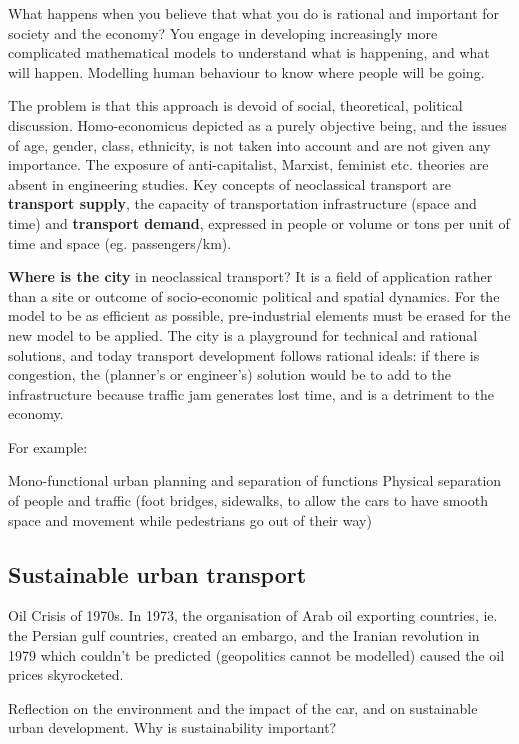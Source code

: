 \documentclass{article}
\begin{document}
What happens when you believe that what you do is rational and important for society and the economy? You engage in developing increasingly more complicated mathematical models to understand what is happening, and what will happen. Modelling human behaviour to know where people will be going. 

The problem is that this approach is devoid of social, theoretical, political discussion. Homo-economicus depicted as a purely objective being, and the issues of age, gender, class, ethnicity, is not taken into account and are not given any importance. The exposure of anti-capitalist, Marxist, feminist etc. theories are absent in engineering studies.
Key concepts of neoclassical transport are \textbf{transport supply}, the capacity of transportation infrastructure (space and time) and \textbf{transport demand}, expressed in people or volume or tons per unit of time and space (eg. passengers/km).

\textbf{Where is the city} in neoclassical transport? It is a field of application rather than a site or outcome of socio-economic political and spatial dynamics. For the model to be as efficient as possible, pre-industrial elements must be erased for the new model to be applied. The city is a playground for technical and rational solutions, and today transport development follows rational ideals: if there is congestion, the (planner's or engineer's) solution would be to add to the infrastructure because traffic jam generates lost time, and is a detriment to the economy. 

For example:

\begin{outline}
	\1 Mono-functional urban planning and separation of functions
	\1 Physical separation of people and traffic (foot bridges, sidewalks, to allow the cars to have smooth space and movement while pedestrians go out of their way)
\end{outline}

\subsection{Sustainable urban transport}

Oil Crisis of 1970s. In 1973, the organisation of Arab oil exporting countries, ie. the Persian gulf countries, created an embargo, and the Iranian revolution in 1979 which couldn't be predicted (geopolitics cannot be modelled) caused the oil prices skyrocketed.

Reflection on the environment and the impact of the car, and on sustainable urban development. Why is sustainability important?
\end{document}

